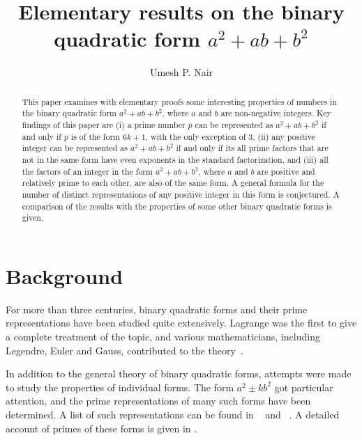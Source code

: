 \documentclass[reqno]{amsart}
\begin{document}
\title{Elementary results on the binary quadratic form  \boldmath$a^2+ab+b^2$\unboldmath}
\author{Umesh P. Nair}
\address{Mentor Graphics Corporation, 8005
  SW Boeckman Road, Wilsonville, OR 97070,
  USA.} 

\begin{abstract}
  This paper examines with elementary proofs some
  interesting properties of numbers in the binary
  quadratic form $a^2+ab+b^2$, where $a$ and $b$ are
  non-negative integers.  Key findings of this paper
  are (i) a prime number $p$ can be represented as
  $a^2+ab+b^2$ if and only if $p$ is of the form $6k+1$,
  with the only exception of $3$, (ii) any positive integer
  can be represented as $a^2+ab+b^2$ if and only if its
  all prime factors that are not in the same form have even
  exponents in the standard factorization, and (iii)
  all the factors of an integer in the form $a^2+ab+b^2$,
  where $a$ and $b$ are positive and relatively prime
  to each other, are also of the same form.  A
  general formula for the number of distinct
  representations of any positive integer in this form
  is conjectured.  A comparison of the results with the
  properties of some other binary quadratic forms
  is given.
\end{abstract}
  \maketitle

\section{Background}

For more than three centuries, binary quadratic forms
and their prime representations have been studied quite
extensively.  Lagrange was the first to give a complete
treatment of the topic, and various mathematicians,
including Legendre, Euler and Gauss, contributed to the
theory~\cite{DAV1999,DIC1923}.


In addition to the general theory of binary quadratic
forms, attempts were made to study the properties of
individual forms.  The form $a^2 \pm kb^2$ got
particular attention, and the prime representations of
many such forms have been determined.  A list of such
representations can be found in ~\cite[p. 71]{BER1994} and
~\cite{MWPrimeRep}.  A detailed account of primes of these
forms is given in \cite{COX1989}.
\end{document}
